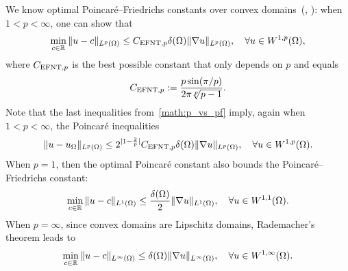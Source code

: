 \documentclass[10pt,a4paper]{article}
\begin{document}
We know optimal Poincar\'e--Friedrichs constants over convex domains~(\cite[Theorem~1.1]{ferone2012remark}, \cite[Theorem~1.1]{esposito2013poincare}): 
when $1 < p < \infty$, one can show that 
\begin{align}\label{math:esposito:pf}
    \min\limits_{ c \in {\mathbb R} }
    \| u - c \|_{L^{p}(\Omega)}
    \leq 
    C_{{\rm EFNT},p}
    {\delta}(\Omega)
    \| \nabla u \|_{L^{p}(\Omega)}
    ,
    \quad 
    \forall 
    u \in W^{1,p}(\Omega)
    ,
\end{align}
where $C_{{\rm EFNT},p}$ is the best possible constant that only depends on $p$ and equals 
\begin{align*}
    C_{{\rm EFNT},p}
    :=
    \frac{ p \sin(\pi/p) }{ 2\pi \sqrt[p]{p-1} }
    .
\end{align*}
Note that the last inequalities from~\eqref{math:p_vs_pf} imply, again when $1 < p < \infty$, the Poincar\'e inequalities
\begin{align}\label{math:esposito:poincare}
    \| u - u_{\Omega} \|_{L^{p}(\Omega)}
    \leq 
    2^{|1-\frac 2 p|}C_{{\rm EFNT},p}
    {\delta}(\Omega)
    \| \nabla u \|_{L^{p}(\Omega)}
    ,
    \quad 
    \forall 
    u \in W^{1,p}(\Omega)
    .
\end{align}
When $p=1$, then the optimal Poincar\'e constant also bounds the Poincar\'e--Friedrichs constant:
\begin{align}\label{math:l1estimate}
    \min\limits_{ c \in {\mathbb R} }
    \| u - c \|_{L^{1}(\Omega)}
    \leq 
    \frac{ {\delta}(\Omega) }{2}
    \| \nabla u \|_{L^{1}(\Omega)}
    ,
    \quad 
    \forall 
    u \in W^{1,1}(\Omega)
    .
\end{align}
When $p=\infty$, since convex domains are Lipschitz domains, Rademacher's theorem leads to 
\begin{align}\label{math:lipschitzestimate}
    \min\limits_{ c \in {\mathbb R} }
    \| u - c \|_{L^{\infty}(\Omega)}
    \leq 
    {\delta}(\Omega)
    \| \nabla u \|_{L^{\infty}(\Omega)}
    ,
    \quad 
    \forall 
    u \in W^{1,\infty}(\Omega)
    .
\end{align}


\end{document}
